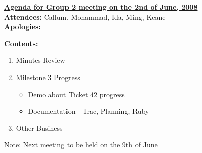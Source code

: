 \documentclass{letter}
\begin{document}
{\large \textbf{\underline{Agenda for Group 2 meeting on the 2nd of June, 2008}}}\\

\textbf{Attendees:} Callum, Mohammad, Ida, Ming, Keane\\
\textbf{Apologies:}

\textbf{Contents:}

\begin{enumerate}
\item Minutes Review
\item Milestone 3 Progress
	\begin{itemize}
	\item Demo about Ticket 42 progress
	\item Documentation - Trac, Planning, Ruby
	\end{itemize}
\item Other Business
\end{enumerate}
 
Note: Next meeting to be held on the 9th of June
\end{document}

